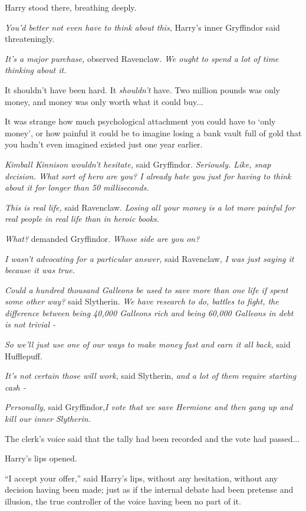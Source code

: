 Harry stood there, breathing deeply.

\emph{You'd better not even have to think about this,} Harry's inner
Gryffindor said threateningly.

\emph{It's a major purchase,} observed Ravenclaw. \emph{We ought to
spend a lot of time thinking about it.}

It shouldn't have been hard. It \emph{shouldn't} have. Two million
pounds was only money, and money was only worth what it could
buy...

It was strange how much psychological attachment you could have to `only
money', or how painful it could be to imagine losing a bank vault full
of gold that you hadn't even imagined existed just one year earlier.

\emph{Kimball Kinnison wouldn't hesitate,} said Gryffindor.
\emph{Seriously. Like, snap decision. What sort of hero are you? I
already hate you just for having to think about it for longer than 50
milliseconds.}

\emph{This is real life,} said Ravenclaw. \emph{Losing all your money is
a lot more painful for real people in real life than in heroic books.}

\emph{What?} demanded Gryffindor. \emph{Whose side are you on?}

\emph{I wasn't advocating for a particular answer,} said Ravenclaw,
\emph{I was just saying it because it was true.}

\emph{Could a hundred thousand Galleons be used to save more than one
life if spent some other way?} said Slytherin. \emph{We have research to
do, battles to fight, the difference between being 40,000 Galleons rich
and being 60,000 Galleons in debt is not trivial -}

\emph{So we'll just use one of our ways to make money fast and earn it
all back,} said Hufflepuff.

\emph{It's not certain those will work,} said Slytherin, \emph{and a lot
of them require starting cash -}

\emph{Personally,} said Gryffindor,\emph{I vote that we save Hermione
and then gang up and kill our inner Slytherin.}

The clerk's voice said that the tally had been recorded and the vote had
passed...

Harry's lips opened.

``I accept your offer,'' said Harry's lips, without any hesitation,
without any decision having been made; just as if the internal debate
had been pretense and illusion, the true controller of the voice having
been no part of it.

